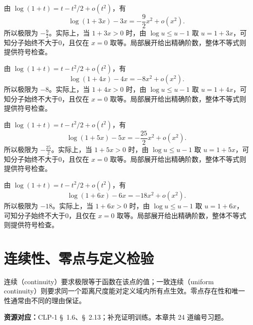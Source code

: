 \documentclass[UTF8,12pt,a4paper,fontset=fandol]{ctexart}
\begin{document}
\begin{solve}\label{ans:c5q21}
由 $\log(1+t)=t-t^2/2+o(t^2)$，有
\[
\log(1+3x)-3x=-\frac{9}{2}x^2+o(x^2).
\]
所以极限为 $-\frac{9}{2}$。实际上，当 $1+3x>0$ 时，由 $\log u\le u-1$ 取 $u=1+3x$，可知分子始终不大于0，且仅在 $x=0$ 取等。局部展开给出精确阶数，整体不等式则提供符号检查。
\end{solve}

\begin{solve}\label{ans:c5q22}
由 $\log(1+t)=t-t^2/2+o(t^2)$，有
\[
\log(1+4x)-4x=-8x^2+o(x^2).
\]
所以极限为 $-8$。实际上，当 $1+4x>0$ 时，由 $\log u\le u-1$ 取 $u=1+4x$，可知分子始终不大于0，且仅在 $x=0$ 取等。局部展开给出精确阶数，整体不等式则提供符号检查。
\end{solve}

\begin{solve}\label{ans:c5q23}
由 $\log(1+t)=t-t^2/2+o(t^2)$，有
\[
\log(1+5x)-5x=-\frac{25}{2}x^2+o(x^2).
\]
所以极限为 $-\frac{25}{2}$。实际上，当 $1+5x>0$ 时，由 $\log u\le u-1$ 取 $u=1+5x$，可知分子始终不大于0，且仅在 $x=0$ 取等。局部展开给出精确阶数，整体不等式则提供符号检查。
\end{solve}

\begin{solve}\label{ans:c5q24}
由 $\log(1+t)=t-t^2/2+o(t^2)$，有
\[
\log(1+6x)-6x=-18x^2+o(x^2).
\]
所以极限为 $-18$。实际上，当 $1+6x>0$ 时，由 $\log u\le u-1$ 取 $u=1+6x$，可知分子始终不大于0，且仅在 $x=0$ 取等。局部展开给出精确阶数，整体不等式则提供符号检查。
\end{solve}

\clearpage
\section{连续性、零点与定义检验}\label{sec:ch6}
连续（continuity）要求极限等于函数在该点的值；一致连续（uniform continuity）则要求同一个距离尺度能对定义域内所有点生效。零点存在性和唯一性通常由不同的理由保证。

\textbf{资源对应：}CLP-1 \S~1.6、\S~2.13；补充证明训练。本章共 24 道编号习题。
\end{document}
